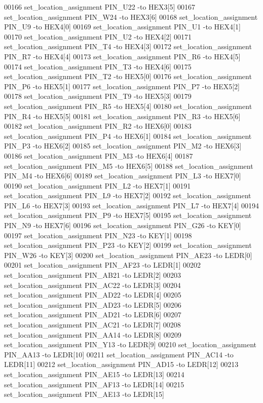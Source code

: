 \begin{DoxyCode}
00166 set\_location\_assignment PIN\_U22 -to HEX3[5]
00167 set\_location\_assignment PIN\_W24 -to HEX3[6]
00168 set\_location\_assignment PIN\_U9 -to HEX4[0]
00169 set\_location\_assignment PIN\_U1 -to HEX4[1]
00170 set\_location\_assignment PIN\_U2 -to HEX4[2]
00171 set\_location\_assignment PIN\_T4 -to HEX4[3]
00172 set\_location\_assignment PIN\_R7 -to HEX4[4]
00173 set\_location\_assignment PIN\_R6 -to HEX4[5]
00174 set\_location\_assignment PIN\_T3 -to HEX4[6]
00175 set\_location\_assignment PIN\_T2 -to HEX5[0]
00176 set\_location\_assignment PIN\_P6 -to HEX5[1]
00177 set\_location\_assignment PIN\_P7 -to HEX5[2]
00178 set\_location\_assignment PIN\_T9 -to HEX5[3]
00179 set\_location\_assignment PIN\_R5 -to HEX5[4]
00180 set\_location\_assignment PIN\_R4 -to HEX5[5]
00181 set\_location\_assignment PIN\_R3 -to HEX5[6]
00182 set\_location\_assignment PIN\_R2 -to HEX6[0]
00183 set\_location\_assignment PIN\_P4 -to HEX6[1]
00184 set\_location\_assignment PIN\_P3 -to HEX6[2]
00185 set\_location\_assignment PIN\_M2 -to HEX6[3]
00186 set\_location\_assignment PIN\_M3 -to HEX6[4]
00187 set\_location\_assignment PIN\_M5 -to HEX6[5]
00188 set\_location\_assignment PIN\_M4 -to HEX6[6]
00189 set\_location\_assignment PIN\_L3 -to HEX7[0]
00190 set\_location\_assignment PIN\_L2 -to HEX7[1]
00191 set\_location\_assignment PIN\_L9 -to HEX7[2]
00192 set\_location\_assignment PIN\_L6 -to HEX7[3]
00193 set\_location\_assignment PIN\_L7 -to HEX7[4]
00194 set\_location\_assignment PIN\_P9 -to HEX7[5]
00195 set\_location\_assignment PIN\_N9 -to HEX7[6]
00196 set\_location\_assignment PIN\_G26 -to KEY[0]
00197 set\_location\_assignment PIN\_N23 -to KEY[1]
00198 set\_location\_assignment PIN\_P23 -to KEY[2]
00199 set\_location\_assignment PIN\_W26 -to KEY[3]
00200 set\_location\_assignment PIN\_AE23 -to LEDR[0]
00201 set\_location\_assignment PIN\_AF23 -to LEDR[1]
00202 set\_location\_assignment PIN\_AB21 -to LEDR[2]
00203 set\_location\_assignment PIN\_AC22 -to LEDR[3]
00204 set\_location\_assignment PIN\_AD22 -to LEDR[4]
00205 set\_location\_assignment PIN\_AD23 -to LEDR[5]
00206 set\_location\_assignment PIN\_AD21 -to LEDR[6]
00207 set\_location\_assignment PIN\_AC21 -to LEDR[7]
00208 set\_location\_assignment PIN\_AA14 -to LEDR[8]
00209 set\_location\_assignment PIN\_Y13 -to LEDR[9]
00210 set\_location\_assignment PIN\_AA13 -to LEDR[10]
00211 set\_location\_assignment PIN\_AC14 -to LEDR[11]
00212 set\_location\_assignment PIN\_AD15 -to LEDR[12]
00213 set\_location\_assignment PIN\_AE15 -to LEDR[13]
00214 set\_location\_assignment PIN\_AF13 -to LEDR[14]
00215 set\_location\_assignment PIN\_AE13 -to LEDR[15]

\end{DoxyCode}
